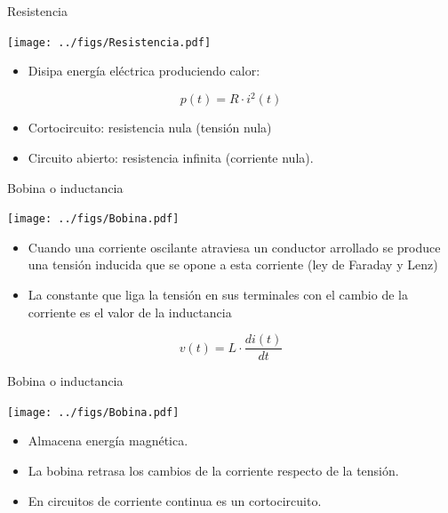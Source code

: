 \documentclass[xcolor={usenames,svgnames,dvipsnames}]{beamer}
\begin{document}
\begin{frame}[label={sec:org67b6acd}]{Resistencia}
\begin{center}
\texttt{[image: ../figs/Resistencia.pdf]}
\end{center}


\begin{itemize}
\item Disipa energía eléctrica produciendo \alert{calor}:
\end{itemize}
\[
p(t)=R\cdot i^{2}(t)
\]

\begin{itemize}
\item Cortocircuito: resistencia nula (tensión nula)

\item Circuito abierto: resistencia infinita (corriente nula).
\end{itemize}
\end{frame}


\begin{frame}[label={sec:org73c0094}]{Bobina o inductancia}
\begin{center}
\texttt{[image: ../figs/Bobina.pdf]}
\end{center}


\begin{itemize}
\item Cuando una corriente oscilante atraviesa un conductor arrollado se
produce una \alert{tensión inducida que se opone a esta corriente} (ley de
Faraday y Lenz)

\item La constante que liga la tensión en sus terminales con el cambio de
la corriente es el valor de la inductancia
\end{itemize}

\[
v(t)=L\cdot\frac{di(t)}{dt}
\]
\end{frame}

\begin{frame}[label={sec:org5ec342f}]{Bobina o inductancia}
\begin{center}
\texttt{[image: ../figs/Bobina.pdf]}
\end{center}


\begin{itemize}
\item Almacena \alert{energía magnética}.

\item La bobina \alert{retrasa los cambios de la corriente} respecto de la
tensión.

\item En circuitos de corriente continua es un cortocircuito.
\end{itemize}
\end{frame}
\end{document}
